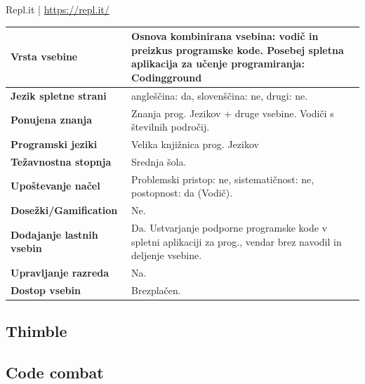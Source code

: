 \begin{osebnabox}[label={osebna:replIT}]{Repl.it | \url{https://repl.it/}}
    \begin{tabular}{
  p{} |
  p{}  }
  \textbf{Vrsta vsebine} & Osnova kombinirana vsebina: vodič in
                           preizkus programske kode. Posebej spletna
                           aplikacija za učenje programiranja:
                           Codingground \\
      \hline
  \textbf{Jezik spletne strani} & angleščina: da, slovenščina: ne,
                                  drugi: ne. \\
      \hline
  \textbf{Ponujena znanja} & Znanja prog. Jezikov + druge
                             vsebine. Vodiči s številnih področij. \\
      \hline
 \textbf{Programski jeziki} & Velika knjižnica prog. Jezikov \\
      \hline
  \textbf{Težavnostna stopnja} & Srednja šola.\\
      \hline
   \textbf{Upoštevanje načel} & Problemski pristop: ne,
                                sistematičnost: ne, postopnost: da (Vodič). \\
      \hline
  \textbf{Dosežki/Gamification} & Ne. \\
      \hline
  \textbf{Dodajanje lastnih vsebin} & Da. Ustvarjanje podporne
                                      programske kode v spletni
                                      aplikaciji za prog., vendar brez
                                      navodil in deljenje vsebine.  \\
      \hline
  \textbf{Upravljanje razreda} & Na. \\
      \hline
  \textbf{Dostop vsebin} & Brezplačen. \\

\end{tabular}
\end{osebnabox}

\subsection{Thimble}
\label{sec:thimble}




\subsection{Code combat}
\label{sec:code_battle}


